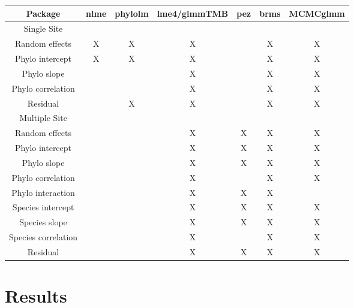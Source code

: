 \begin{tabularx}{\textwidth}{|c||c|c|c|c|c|c|}
\hline
Package	& \small{nlme}	& \small{phylolm}	& \small{lme4/glmmTMB} & \small{pez} & \small{brms} & \small{MCMCglmm} \\
\hline
\hline
Single Site & & & & & & \\
Random effects & X & X & X & & X & X \\
\hline
Phylo intercept & X & X & X &  & X & X \\
Phylo slope &  &  & X &  & X & X \\
Phylo correlation &  &  & X &  & X & X \\
Residual & & X & X &  & X & X \\
\hline
\hline
Multiple Site & & & & & & \\
Random effects &  &  & X & X & X & X \\
\hline
Phylo intercept &  &  & X & X & X & X \\
Phylo slope &  &  & X & X & X & X \\
Phylo correlation &  &  & X &  & X & X \\
Phylo interaction & &  & X & X & X &  \\
Species intercept & &  & X & X & X & X \\
Species slope & & & X & X & X & X \\
Species correlation & &  & X &  & X & X \\
Residual & &  & X & X & X & X \\
\hline

\end{tabularx}

\section{Results}

